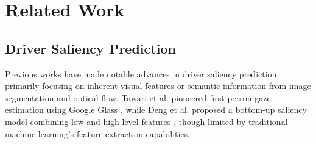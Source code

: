 \section{Related Work}
\subsection{Driver Saliency Prediction}
Previous works have made notable advances in driver saliency prediction, primarily focusing on inherent visual features or semantic information from image segmentation and optical flow. Tawari et al. pioneered first-person gaze estimation using Google Glass \cite{tawari2014attention}, while Deng et al. proposed a bottom-up saliency model combining low and high-level features \cite{deng2017learning}, though limited by traditional machine learning's feature extraction capabilities.

